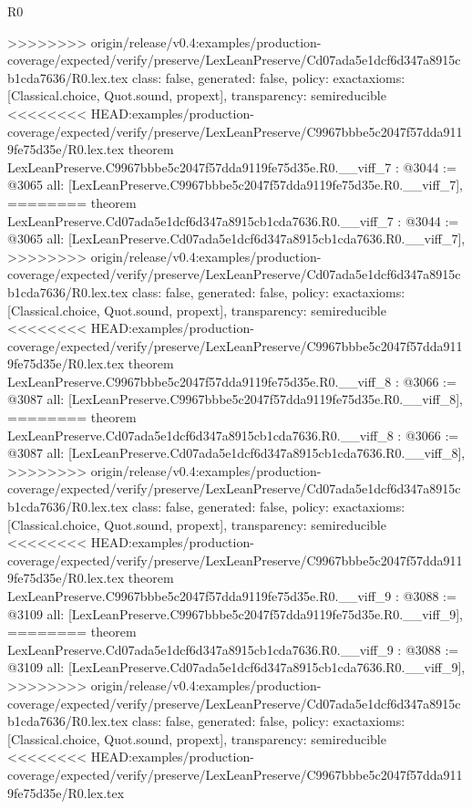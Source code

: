 \begin{lexlean}{R0}
\begin{coremodule}
{{{{{{{{{{{{{{{{{{{{{{{{{{{{{{{{{{{{{{{{{{{{{{{{{{{{{{{{{{{{{{{{>>>>>>>> origin/release/v0.4:examples/production-coverage/expected/verify/preserve/LexLeanPreserve/Cd07ada5e1dcf6d347a8915cb1cda7636/R0.lex.tex
  class: false,
  generated: false,
  policy: exact{axioms: [Classical.choice, Quot.sound, propext]},
  transparency: semireducible
}
<<<<<<<< HEAD:examples/production-coverage/expected/verify/preserve/LexLeanPreserve/C9967bbbe5c2047f57dda9119fe75d35e/R0.lex.tex
theorem LexLeanPreserve.C9967bbbe5c2047f57dda9119fe75d35e.R0.__viff_7 : @3044 := @3065 {
  all: [LexLeanPreserve.C9967bbbe5c2047f57dda9119fe75d35e.R0.__viff_7],
========
theorem LexLeanPreserve.Cd07ada5e1dcf6d347a8915cb1cda7636.R0.__viff_7 : @3044 := @3065 {
  all: [LexLeanPreserve.Cd07ada5e1dcf6d347a8915cb1cda7636.R0.__viff_7],
>>>>>>>> origin/release/v0.4:examples/production-coverage/expected/verify/preserve/LexLeanPreserve/Cd07ada5e1dcf6d347a8915cb1cda7636/R0.lex.tex
  class: false,
  generated: false,
  policy: exact{axioms: [Classical.choice, Quot.sound, propext]},
  transparency: semireducible
}
<<<<<<<< HEAD:examples/production-coverage/expected/verify/preserve/LexLeanPreserve/C9967bbbe5c2047f57dda9119fe75d35e/R0.lex.tex
theorem LexLeanPreserve.C9967bbbe5c2047f57dda9119fe75d35e.R0.__viff_8 : @3066 := @3087 {
  all: [LexLeanPreserve.C9967bbbe5c2047f57dda9119fe75d35e.R0.__viff_8],
========
theorem LexLeanPreserve.Cd07ada5e1dcf6d347a8915cb1cda7636.R0.__viff_8 : @3066 := @3087 {
  all: [LexLeanPreserve.Cd07ada5e1dcf6d347a8915cb1cda7636.R0.__viff_8],
>>>>>>>> origin/release/v0.4:examples/production-coverage/expected/verify/preserve/LexLeanPreserve/Cd07ada5e1dcf6d347a8915cb1cda7636/R0.lex.tex
  class: false,
  generated: false,
  policy: exact{axioms: [Classical.choice, Quot.sound, propext]},
  transparency: semireducible
}
<<<<<<<< HEAD:examples/production-coverage/expected/verify/preserve/LexLeanPreserve/C9967bbbe5c2047f57dda9119fe75d35e/R0.lex.tex
theorem LexLeanPreserve.C9967bbbe5c2047f57dda9119fe75d35e.R0.__viff_9 : @3088 := @3109 {
  all: [LexLeanPreserve.C9967bbbe5c2047f57dda9119fe75d35e.R0.__viff_9],
========
theorem LexLeanPreserve.Cd07ada5e1dcf6d347a8915cb1cda7636.R0.__viff_9 : @3088 := @3109 {
  all: [LexLeanPreserve.Cd07ada5e1dcf6d347a8915cb1cda7636.R0.__viff_9],
>>>>>>>> origin/release/v0.4:examples/production-coverage/expected/verify/preserve/LexLeanPreserve/Cd07ada5e1dcf6d347a8915cb1cda7636/R0.lex.tex
  class: false,
  generated: false,
  policy: exact{axioms: [Classical.choice, Quot.sound, propext]},
  transparency: semireducible
}
<<<<<<<< HEAD:examples/production-coverage/expected/verify/preserve/LexLeanPreserve/C9967bbbe5c2047f57dda9119fe75d35e/R0.lex.tex
}}}}}}}}}}}}}}}}}}}}}}}}}}}}}}}}}}}}}}}}}}}}}}}}}}}}}}}}}}}}}}}}}}
\end{coremodule}
\end{lexlean}
